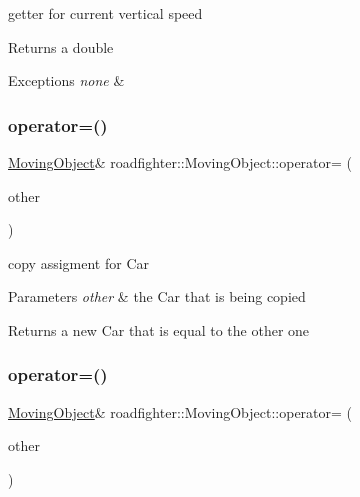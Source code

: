 getter for current vertical speed \begin{DoxyReturn}{Returns}
a double 
\end{DoxyReturn}

\begin{DoxyExceptions}{Exceptions}
{\em none} & \\
\hline
\end{DoxyExceptions}
\mbox{\label{classroadfighter_1_1MovingObject_a46d710b11219a0e973eb1e4d3b375851}} 
\subsubsection{\texorpdfstring{operator=()}{operator=()}\hspace{0.1cm}{\footnotesize\ttfamily [1/2]}}
{\footnotesize\ttfamily \hyperlink{classroadfighter_1_1MovingObject}{Moving\+Object}\& roadfighter\+::\+Moving\+Object\+::operator= (\begin{DoxyParamCaption}\item[{const \hyperlink{classroadfighter_1_1MovingObject}{Moving\+Object} \&}]{other }\end{DoxyParamCaption})\hspace{0.3cm}{\ttfamily [default]}}

copy assigment for Car 
\begin{DoxyParams}{Parameters}
{\em other} & the Car that is being copied \\
\hline
\end{DoxyParams}
\begin{DoxyReturn}{Returns}
a new Car that is equal to the other one 
\end{DoxyReturn}
\mbox{\label{classroadfighter_1_1MovingObject_ae2150a0937d9e1b978bcdf2ba1628677}} 
\subsubsection{\texorpdfstring{operator=()}{operator=()}\hspace{0.1cm}{\footnotesize\ttfamily [2/2]}}
{\footnotesize\ttfamily \hyperlink{classroadfighter_1_1MovingObject}{Moving\+Object}\& roadfighter\+::\+Moving\+Object\+::operator= (\begin{DoxyParamCaption}\item[{\hyperlink{classroadfighter_1_1MovingObject}{Moving\+Object} \&\&}]{other }\end{DoxyParamCaption})\hspace{0.3cm}{\ttfamily [default]}}

